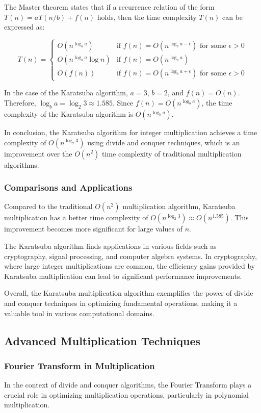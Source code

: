 \documentclass[12pt]{book} %
\begin{document}
The Master theorem states that if a recurrence relation of the form \(T(n) = aT(n/b) + f(n)\) holds, then the time complexity \(T(n)\) can be expressed as:

\[
T(n) = \begin{cases}
O(n^{\log_b a}) & \text{if } f(n) = O(n^{\log_b a - \epsilon}) \text{ for some } \epsilon > 0 \\
O(n^{\log_b a} \log n) & \text{if } f(n) = O(n^{\log_b a}) \\
O(f(n)) & \text{if } f(n) = O(n^{\log_b a + \epsilon}) \text{ for some } \epsilon > 0
\end{cases}
\]

In the case of the Karatsuba algorithm, \(a = 3\), \(b = 2\), and \(f(n) = O(n)\). Therefore, \(\log_b a = \log_2 3 \approx 1.585\). Since \(f(n) = O(n^{\log_b a})\), the time complexity of the Karatsuba algorithm is \(O(n^{\log_b a})\).

In conclusion, the Karatsuba algorithm for integer multiplication achieves a time complexity of \(O(n^{\log_2 3})\) using divide and conquer techniques, which is an improvement over the \(O(n^2)\) time complexity of traditional multiplication algorithms.

\subsubsection{Comparisons and Applications}
Compared to the traditional \(O(n^2)\) multiplication algorithm, Karatsuba multiplication has a better time complexity of \(O(n^{\log_2 3}) \approx O(n^{1.585})\). This improvement becomes more significant for large values of \(n\).

The Karatsuba algorithm finds applications in various fields such as cryptography, signal processing, and computer algebra systems. In cryptography, where large integer multiplications are common, the efficiency gains provided by Karatsuba multiplication can lead to significant performance improvements.

Overall, the Karatsuba multiplication algorithm exemplifies the power of divide and conquer techniques in optimizing fundamental operations, making it a valuable tool in various computational domains.

\subsection{Advanced Multiplication Techniques}

\subsubsection{Fourier Transform in Multiplication}
In the context of divide and conquer algorithms, the Fourier Transform plays a crucial role in optimizing multiplication operations, particularly in polynomial multiplication.
\end{document}
